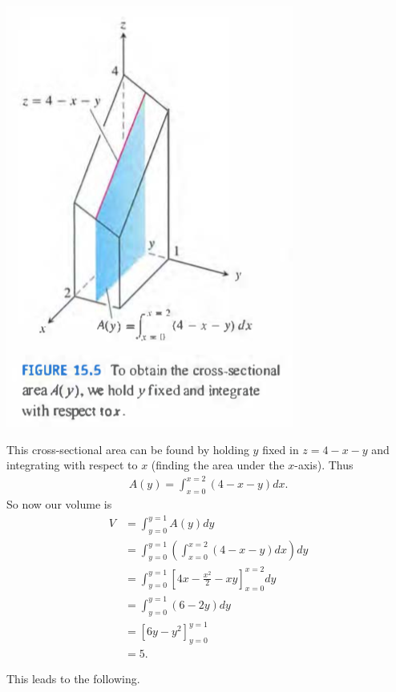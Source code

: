\documentclass[12pt, letter]{article}
\theoremstyle{plain}
\numberwithin{theorem}{section}
\theoremstyle{definition}
\begin{document}
\bigskip

\begin{center}
\includegraphics[scale=0.7]{m3_f3}
\end{center}

\bigskip

This cross-sectional area can be found by holding $y$ fixed in $z=4-x-y$ and integrating with respect to $x$ (finding the area under the $x$-axis). Thus
\begin{align*}
A(y) = \int_{x=0}^{x=2} (4-x-y) dx.
\end{align*}
So now our volume is
\begin{align*}
V &= \int_{y=0}^{y=1} A(y) dy\\
&= \int_{y=0}^{y=1} \left(\int_{x=0}^{x=2} (4-x-y)dx \right) dy\\
&= \int_{y=0}^{y=1} \left[ 4x-\frac{x^2}{2}-xy\right]_{x=0}^{x=2} dy\\
&= \int_{y=0}^{y=1} \left(6-2y\right)dy\\
&= \left[ 6y-y^2 \right]_{y=0}^{y=1}\\
&=5.
\end{align*}

\bigskip

This leads to the following.

\bigskip
\end{document}

